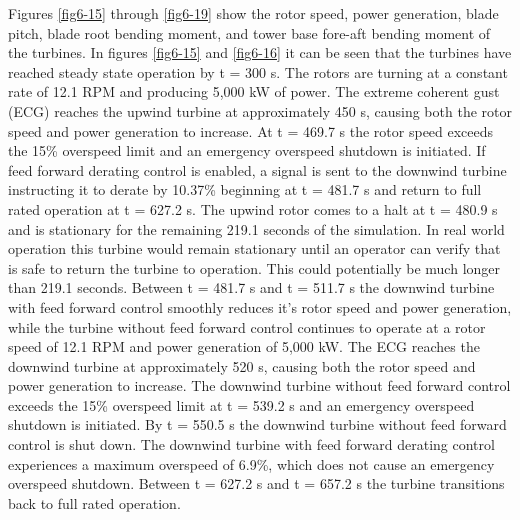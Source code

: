 Figures \ref{fig6-15} through \ref{fig6-19} show the rotor speed, power generation, blade pitch, blade root bending moment, and tower base fore-aft bending moment of the turbines. In figures \ref{fig6-15} and \ref{fig6-16} it can be seen that the turbines have reached steady state operation by t = 300 s. The rotors are turning at a constant rate of 12.1 RPM and  producing 5,000 kW of power. The extreme coherent gust (ECG) reaches the upwind turbine at approximately 450 s, causing both the rotor speed and power generation to increase. At t = 469.7 s the rotor speed exceeds the 15\% overspeed limit and an emergency overspeed shutdown is initiated. If feed forward derating control is enabled, a signal is sent to the downwind turbine instructing it to derate by 10.37\% beginning at t = 481.7 s and return to full rated operation at t = 627.2 s. The upwind rotor comes to a halt at t = 480.9 s and is stationary for the remaining 219.1 seconds of the simulation. In real world operation this turbine would remain stationary until an operator can verify that is safe to return the turbine to operation. This could potentially be much longer than 219.1 seconds. Between t = 481.7 s and t = 511.7 s the downwind turbine with feed forward control smoothly reduces it's rotor speed and power generation, while the turbine without feed forward control continues to operate at a rotor speed of 12.1 RPM and power generation of 5,000 kW. The ECG reaches the downwind turbine at approximately 520 s, causing both the rotor speed and power generation to increase. The downwind turbine without feed forward control exceeds the 15\% overspeed limit at t = 539.2 s and an emergency overspeed shutdown is initiated. By t = 550.5 s the downwind turbine without feed forward control is shut down. The downwind turbine with feed forward derating control experiences a maximum overspeed of 6.9\%, which does not cause an emergency overspeed shutdown. Between t = 627.2 s and t = 657.2 s the turbine transitions back to full rated operation.

